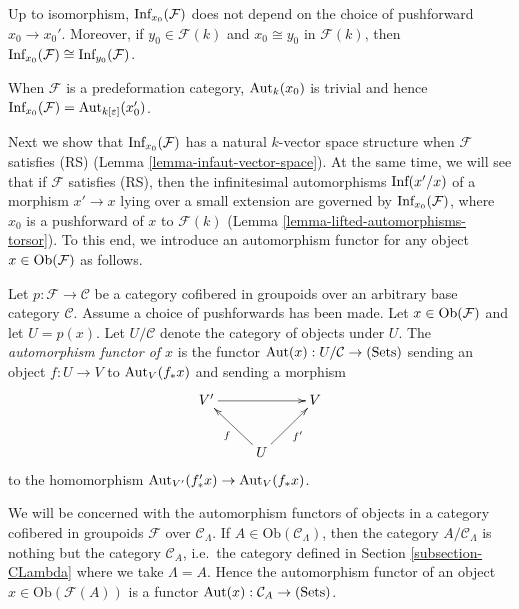 \begin{remark}
Up to isomorphism, $\textnormal{Inf}_{x_0}(\mathcal F)$ does not depend on the 
choice of pushforward $x_0 \rightarrow x_0'$.  Moreover, if $y_0 \in \mathcal 
F(k)$ and $x_0 \cong y_0$ in $\mathcal F(k)$, then 
$\textnormal{Inf}_{x_0}(\mathcal F) \cong \textnormal{Inf}_{y_0}(\mathcal F)$.
\end{remark}

\begin{remark}
When $\mathcal F$ is a predeformation category, $\textnormal{Aut}_{k}(x_0)$ is 
trivial and hence $\textnormal{Inf}_{x_0}(\mathcal F) = 
\textnormal{Aut}_{k[\varepsilon]}(x'_0)$.
\end{remark}

\noindent
Next we show that $\textnormal{Inf}_{x_0}(\mathcal F)$ has a natural $k$-vector 
space structure when $\mathcal F$ satisfies (RS) (Lemma 
\ref{lemma-infaut-vector-space}).  At the same time, we will see that if 
$\mathcal F$ satisfies (RS), then the infinitesimal automorphisms 
$\textnormal{Inf}(x'/x)$ of a morphism $x' \rightarrow x$ lying over a small 
extension are governed by $\textnormal{Inf}_{x_0}(\mathcal F)$, where $x_0$ is 
a pushforward of $x$ to $\mathcal F(k)$ (Lemma 
\ref{lemma-lifted-automorphisms-torsor}).  To this end, we introduce an 
automorphism functor for any object $x \in \textnormal{Ob}(\mathcal F)$ as 
follows.

\begin{definition}
Let $p: \mathcal F \rightarrow \mathcal C$ be a category cofibered in groupoids 
over an arbitrary base category $\mathcal C$. Assume a choice of pushforwards 
has been made.  Let $x \in \textnormal{Ob}(\mathcal F)$ and let $U = p(x)$.  
Let $U/\mathcal C$ denote the category of objects under $U$. The 
\emph{automorphism functor of $x$} is the functor $\textnormal{Aut}(x): 
U/\mathcal C \rightarrow \textnormal{(Sets)}$ sending an object $f: U 
\rightarrow V$ to $\textnormal{Aut}_{V}(f_*x)$ and sending a morphism
\[
\xymatrix{
V' \ar[rr] &                    & V\\
          & U \ar[ul]^{f}  \ar[ur]_{f'} & 
}
\]
to the homomorphism $\textnormal{Aut}_{V'}(f'_*x) \rightarrow 
\textnormal{Aut}_{V}(f_*x)$.
\end{definition}

\noindent 
We will be concerned with the automorphism functors of objects in a category 
cofibered in groupoids $\mathcal F$ over $\mathcal C_{\Lambda}$.  If $A \in 
\text{Ob}(\mathcal C_{\Lambda})$, then the category $A/\mathcal C_{\Lambda}$ is 
nothing but the category $\mathcal C_{A}$, i.e.\ the category defined in 
Section \ref{subsection-CLambda} where we take $\Lambda = A$.  Hence the 
automorphism functor of an object $x \in \text{Ob}(\mathcal F(A))$ is a functor 
$\textnormal{Aut}(x): \mathcal C_{A} \rightarrow \textnormal{(Sets)}$.

